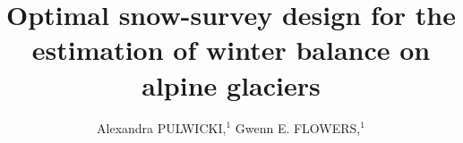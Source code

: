 \documentclass[twocolumn,letterpaper]{igs}
\begin{document}
\title[Optimal snow-survey design for estimating winter balance]{Optimal snow-survey design for the estimation of winter balance on alpine glaciers}

\author[Pulwicki and Flowers]{Alexandra PULWICKI,$^1$
  Gwenn E. FLOWERS,$^1$}







\end{document}
